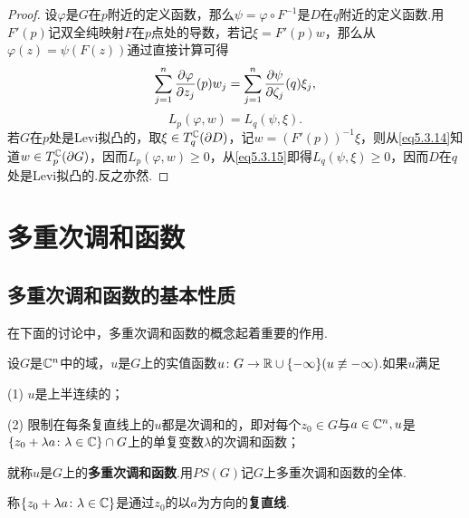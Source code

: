 \begin{proof}
	设$\varphi$是$G$在$p$附近的定义函数，那么$\psi=\varphi\circ F^{-1}$是$D$在$q$附近的定义函数.用$F'(p)$记双全纯映射$F$在$p$点处的导数，若记$\xi=F'(p)w$，那么从$\varphi(z)=\psi(F(z))$通过直接计算可得
	\begin{equation}\label{eq5.3.14}
		\sum_{j=1}^{n}\frac{\partial \varphi}{\partial z_j}(p)w_j=\sum_{j=1}^{n}\frac{\partial \psi}{\partial \zeta_j}(q)\xi_j,
	\end{equation}
\begin{equation}\label{eq5.3.15}
	L_p(\varphi,w)=L_q(\psi,\xi).
\end{equation}
若$G$在$p$处是Levi拟凸的，取$\xi\in T_q^\mathbb C(\partial D)$，记$w=(F'(p))^{-1}\xi$，则从\eqref{eq5.3.14}知道$w\in T_p^\mathbb C(\partial G)$，因而$L_p(\varphi,w)\ge0$，从\eqref{eq5.3.15}即得$L_q(\psi,\xi)\ge0$，因而$D$在$q$处是Levi拟凸的.反之亦然.
\end{proof}
\section{多重次调和函数\label{sec5.4}}
\subsection{多重次调和函数的基本性质}
在下面的讨论中，多重次调和函数的概念起着重要的作用.
\begin{definition}\label{def5.4.1}
	设$G$是$\mathbb C^n$中的域，$u$是$G$上的实值函数$u\colon G\to\mathbb R\cup\{-\infty\}(u\not\equiv-\infty)$.如果$u$满足
	
	(1)\hypertarget{5.4.1}{}
	$u$是上半连续的；
	
	(2)\hypertarget{5.4.1}{}
	限制在每条复直线上的$u$都是次调和的，即对每个$z_0\in G$与$a\in\mathbb C^n,u$是$\{z_0+\lambda a\colon\lambda\in\mathbb C\}\cap G$上的单复变数$\lambda$的次调和函数；
	
	就称$u$是$G$上的\textbf{多重次调和函数}.用$PS(G)$记$G$上多重次调和函数的全体.
\end{definition}
称$\{z_0+\lambda a\colon\lambda\in\mathbb C\}$是通过$z_0$的以$a$为方向的\textbf{复直线}.


